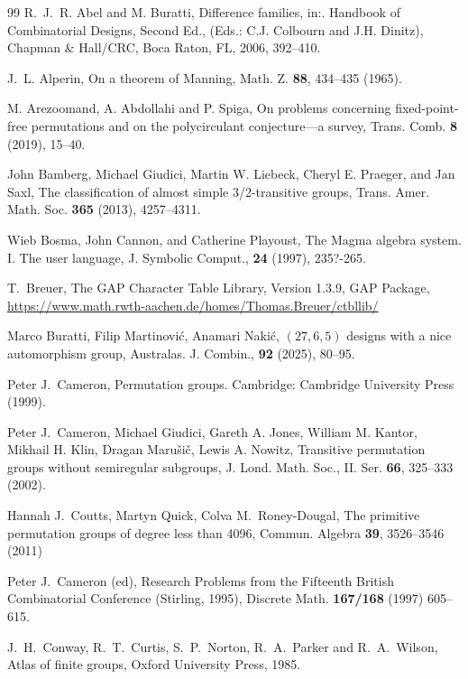 \documentclass{article}
\theoremstyle{remark}
\theoremstyle{definition}
\begin{document}
\begin{thebibliography}{99}
R.~J.~R. Abel and M. Buratti, Difference families, in:. Handbook of Combinatorial
Designs, Second Ed., (Eds.: C.J. Colbourn and J.H. Dinitz), Chapman \&
Hall/CRC, Boca Raton, FL, 2006, 392--410.

J.~L. Alperin, On a theorem of Manning, Math. Z. \textbf{88}, 434--435 (1965).

M. Arezoomand, A. Abdollahi and P. Spiga, On problems concerning fixed-point-free permutations and on the polycirculant conjecture---a survey, Trans. Comb. {\bf 8} (2019),  15--40.

John Bamberg, Michael Giudici, Martin W. Liebeck, Cheryl E. Praeger, and Jan Saxl, The classification of almost simple 3/2-transitive groups, Trans. Amer. Math. Soc. \textbf{365} (2013),  4257--4311.

Wieb Bosma, John Cannon, and Catherine Playoust, The Magma algebra system. I. The user language, J. Symbolic Comput., \textbf{24} (1997), 235?-265.



T.~Breuer, The GAP Character Table Library, Version 1.3.9, GAP Package, \url{https://www.math.rwth-aachen.de/homes/Thomas.Breuer/ctbllib/}

Marco Buratti, Filip Martinovi\'{c},  Anamari Naki\'{c},
{$(27, 6, 5)$} designs with a nice automorphism group,
Australas. J.  Combin.,  {\bf 92} (2025), 80--95.


Peter J.~Cameron, Permutation groups. Cambridge: Cambridge University Press (1999).

Peter J.~Cameron,   Michael Giudici,   Gareth A. Jones,     William M. Kantor,    Mikhail H. Klin,    Dragan Maru{\v{s}}i{\v{c}},    Lewis A. Nowitz, Transitive permutation groups without semiregular subgroups, J. Lond. Math. Soc., II. Ser. \textbf{66},  325--333 (2002).

 Hannah J.~Coutts, Martyn Quick, Colva M.~Roney-Dougal, The primitive permutation groups of degree less than 4096, Commun. Algebra \textbf{39}, 3526--3546 (2011)

Peter J.~Cameron (ed), Research Problems from the Fifteenth British Combinatorial Conference 
 (Stirling, 1995), Discrete Math. {\bf 167/168} (1997) 605--615.

J.~H.~Conway, R.~T.~Curtis, S.~P.~Norton, R.~A.~Parker and R.~A.~Wilson, Atlas of finite groups, Oxford
University Press, 1985.







\end{thebibliography}
\end{document}
